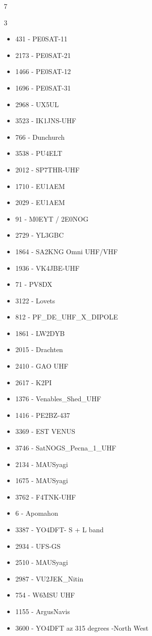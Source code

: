 \documentclass[oneside,a4paper,12pt]{book}
\begin{document}
\begin{thebibliography}{7}
\begin{multicols}{3}
\tiny
\begin{itemize}
    \item 431 - PE0SAT-11
    \item 2173 - PE0SAT-21
    \item 1466 - PE0SAT-12
    \item 1696 - PE0SAT-31
    \item 2968 - UX5UL
    \item 3523 - IK1JNS-UHF
    \item 766 - Dunchurch
    \item 3538 - PU4ELT
    \item 2012 - SP7THR-UHF
    \item 1710 - EU1AEM
    \item 2029 - EU1AEM
    \item 91 - M0EYT / 2E0NOG
    \item 2729 - YL3GBC
    \item 1864 - SA2KNG Omni UHF/VHF
    \item 1936 - VK4JBE-UHF
    \item 71 - PV8DX
    \item 3122 - Lovets
    \item 812 - PF\_DE\_UHF\_X\_DIPOLE
    \item 1861 - LW2DYB
    \item 2015 - Drachten
    \item 2410 - GAO UHF
    \item 2617 - K2PI
    \item 1376 - Venables\_Shed\_UHF
    \item 1416 - PE2BZ-437
    \item 3369 - EST VENUS
    \item 3746 - SatNOGS\_Pecna\_1\_UHF
    \item 2134 - MAUSyagi
    \item 1675 - MAUSyagi
    \item 3762 - F4TNK-UHF
    \item 6 - Apomahon
    \item 3387 - YO4DFT- S + L band
    \item 2934 - UFS-GS
    \item 2510 - MAUSyagi
    \item 2987 - VU2JEK\_Nitin
    \item 754 - W6MSU UHF
    \item 1155 - ArgusNavis
    \item 3600 - YO4DFT az 315 degrees -North West

\end{itemize}
\end{multicols}
\end{thebibliography}
\end{document}
